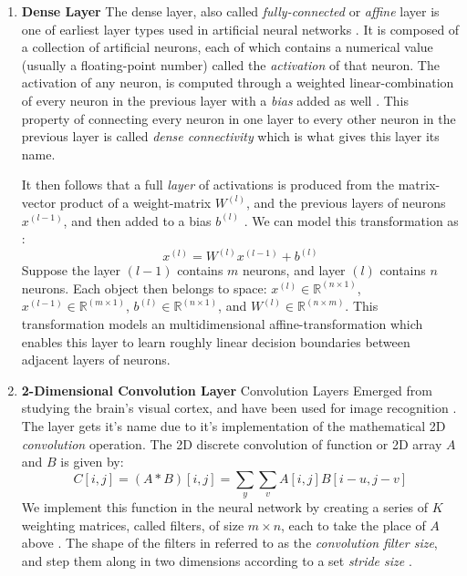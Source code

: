 \documentclass[conference,onecolumn,letterpaper]{IEEEtran}
\begin{document}
\begin{enumerate}

\item\textbf{Dense Layer}
The dense layer, also called \textit{fully-connected} or \textit{affine} layer is one of earliest layer types used in artificial neural networks \cite{Geron}. It is composed of a collection of artificial neurons, each of which contains a numerical value (usually a floating-point number) called the \textit{activation} of that neuron. The activation of any neuron, is computed through a weighted linear-combination of every neuron in the previous layer with a \textit{bias} added as well \cite{Geron,Goodfellow,Tensorflow}. This property of connecting every neuron in one layer to every other neuron in the previous layer is called \textit{dense connectivity} which is what gives this layer its name.

It then follows that a full \textit{layer} of activations is produced from the matrix-vector product of a weight-matrix $W^{(l)}$, and the previous layers of neurons $x^{(l-1)}$, and then added to a bias $b^{(l)}$ \cite{Goodfellow,Tensorflow}. We can model this transformation as :
\begin{equation}
\label{eqn:DenseCall}
x^{(l)} = W^{(l)}x^{(l-1)} + b^{(l)}
\end{equation}
Suppose the layer $(l-1)$ contains $m$ neurons, and layer $(l)$ contains $n$ neurons. Each object then belongs to space: $x^{(l)} \in \mathbb{R}^(n \times 1)$, $x^{(l-1)} \in \mathbb{R}^(m \times 1)$, $b^{(l)} \in \mathbb{R}^(n \times 1)$, and $W^{(l)} \in \mathbb{R}^(n \times m)$. This transformation models an multidimensional affine-transformation which enables this layer to learn roughly linear decision boundaries between adjacent layers of neurons. 

\item\textbf{2-Dimensional Convolution Layer}
Convolution Layers Emerged from studying the brain's visual cortex, and have been used for image recognition \cite{Geron,Goodfellow,Loy}. The layer gets it's name due to it's implementation of the mathematical 2D \textit{convolution} operation. The 2D discrete convolution of function or 2D array $A$ and $B$ is given by:
\begin{equation}
\label{eqn:Conv2D}
C[i,j]  = (A * B)[i,j] = \sum_{y}\sum_{v} A[i,j]B[i-u,j-v]
\end{equation} 
We implement this function in the neural network by creating a series of $K$ weighting matrices, called filters, of size $m \times n$, each to take the place of $A$ above \cite{Geron}. The shape of the filters in referred to as the \textit{convolution filter size}, and step them along in two dimensions according to a set \textit{stride size} \cite{Goodfellow,Loy}.


\end{enumerate}
\end{document}
